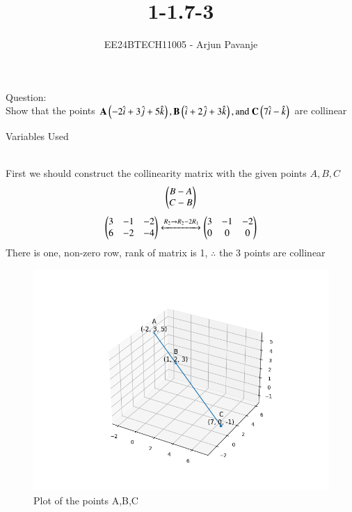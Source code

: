 \documentclass[journal]{IEEEtran}
\begin{document}

\vspace{3cm}

\title{1-1.7-3}
\author{EE24BTECH11005 - Arjun Pavanje
}
{\let\newpage\relax\maketitle}
Question:\\
Show that the points $\mathbf{A}\left(-2\hat{i}+3\hat{j}+5\hat{k}\right), \mathbf{B}\left(\hat{i}+2\hat{j}+3\hat{k}\right), \text{and } \mathbf{C}\left(7\hat{i}-\hat{k}\right)$ are collinear\\
\solution
\begin{table}[h!]    
  \centering
  
  \caption{Variables Used}
  \label{tab1-1.5-29}
\end{table}\\
First we should construct the collinearity matrix with the given points $A,B,C$
\begin{align}
\begin{pmatrix}
B-A \\
C-B
\end{pmatrix}
\end{align}
\begin{align}
\begin{pmatrix}
3 & -1 & -2\\
6 & -2 & -4
\end{pmatrix}
\xleftrightarrow[]{R_2 \rightarrow {R_2-2R_1}}
\begin{pmatrix}
	3 & -1 & -2\\
	0 & 0 & 0
\end{pmatrix}
\end{align}
There is one, non-zero row, rank of matrix is 1, $\therefore$ the 3 points are collinear 
\begin{figure}[h!]
   \centering
   \includegraphics[width=0.7\linewidth]{figs/Figure_1.png}
   \caption{Plot of the points A,B,C}
   \label{stemplot}
\end{figure}
\end{document}
